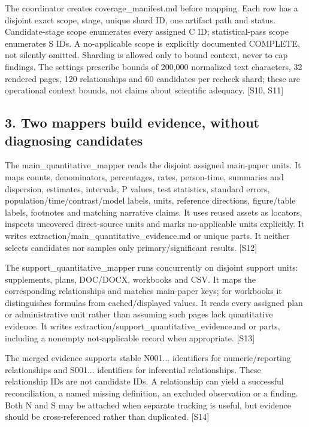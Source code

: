 \documentclass[10pt,a4paper]{article}
\begin{document}
The coordinator creates coverage\_\allowbreak{}manifest.\allowbreak{}md before mapping.\allowbreak{} Each row has a disjoint exact scope, stage, unique shard ID, one artifact path and status.\allowbreak{} Candidate-\allowbreak{}stage scope enumerates every assigned C ID; statistical-\allowbreak{}pass scope enumerates S IDs.\allowbreak{} A no-\allowbreak{}applicable scope is explicitly documented COMPLETE, not silently omitted.\allowbreak{} Sharding is allowed only to bound context, never to cap findings.\allowbreak{} The settings prescribe bounds of 200,000 normalized text characters, 32 rendered pages, 120 relationships and 60 candidates per recheck shard; these are operational context bounds, not claims about scientific adequacy.\allowbreak{} [S10, S11]\par
\subsection*{3.\allowbreak{} Two mappers build evidence, without diagnosing candidates}
The main\_\allowbreak{}quantitative\_\allowbreak{}mapper reads the disjoint assigned main-\allowbreak{}paper units.\allowbreak{} It maps counts, denominators, percentages, rates, person-\allowbreak{}time, summaries and dispersion, estimates, intervals, P values, test statistics, standard errors, population/\allowbreak{}time/\allowbreak{}contrast/\allowbreak{}model labels, units, reference directions, figure/\allowbreak{}table labels, footnotes and matching narrative claims.\allowbreak{} It uses reused assets as locators, inspects uncovered direct-\allowbreak{}source units and marks no-\allowbreak{}applicable units explicitly.\allowbreak{} It writes extraction/\allowbreak{}main\_\allowbreak{}quantitative\_\allowbreak{}evidence.\allowbreak{}md or unique parts.\allowbreak{} It neither selects candidates nor samples only primary/\allowbreak{}significant results.\allowbreak{} [S12]\par
The support\_\allowbreak{}quantitative\_\allowbreak{}mapper runs concurrently on disjoint support units: supplements, plans, DOC/\allowbreak{}DOCX, workbooks and CSV.\allowbreak{} It maps the corresponding relationships and matches main-\allowbreak{}paper keys; for workbooks it distinguishes formulas from cached/\allowbreak{}displayed values.\allowbreak{} It reads every assigned plan or administrative unit rather than assuming such pages lack quantitative evidence.\allowbreak{} It writes extraction/\allowbreak{}support\_\allowbreak{}quantitative\_\allowbreak{}evidence.\allowbreak{}md or parts, including a nonempty not-\allowbreak{}applicable record when appropriate.\allowbreak{} [S13]\par
The merged evidence supports stable N001.\allowbreak{}.\allowbreak{}.\allowbreak{} identifiers for numeric/\allowbreak{}reporting relationships and S001.\allowbreak{}.\allowbreak{}.\allowbreak{} identifiers for inferential relationships.\allowbreak{} These relationship IDs are not candidate IDs.\allowbreak{} A relationship can yield a successful reconciliation, a named missing definition, an excluded observation or a finding.\allowbreak{} Both N and S may be attached when separate tracking is useful, but evidence should be cross-\allowbreak{}referenced rather than duplicated.\allowbreak{} [S14]\par
\end{document}
